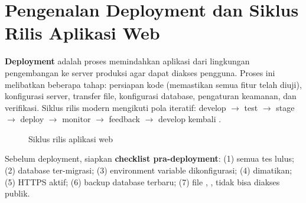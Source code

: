 \section{Pengenalan Deployment dan Siklus Rilis Aplikasi Web}

\textbf{Deployment} adalah proses memindahkan aplikasi dari lingkungan pengembangan ke server produksi agar dapat diakses pengguna. Proses ini melibatkan beberapa tahap: persiapan kode (memastikan semua fitur telah diuji), konfigurasi server, transfer file, konfigurasi database, pengaturan keamanan, dan verifikasi. Siklus rilis modern mengikuti pola iteratif: develop $\to$ test $\to$ stage $\to$ deploy $\to$ monitor $\to$ feedback $\to$ develop kembali \cite{mdnDeploy}.

\begin{figure}[ht]
\centering
{}
\caption{Siklus rilis aplikasi web}
\end{figure}

Sebelum deployment, siapkan \textbf{checklist pra-deployment}: (1) semua tes lulus; (2) database ter-migrasi; (3) environment variable dikonfigurasi; (4)  dimatikan; (5) HTTPS aktif; (6) backup database terbaru; (7) file , ,  tidak bisa diakses publik.

